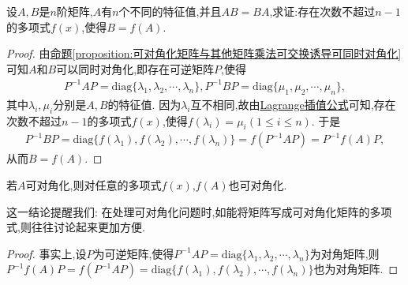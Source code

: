 \documentclass[../../main.tex]{subfiles}
\begin{document}
\begin{proposition}\label{proposition:有n个不同特征值的矩阵乘法可交换诱导多项式表示}
设$A,B$是$n$阶矩阵,$A$有$n$个不同的特征值,并且$AB = BA$,求证:存在次数不超过$n - 1$的多项式$f(x)$,使得$B = f(A)$.
\end{proposition}
\begin{proof}
由\hyperref[proposition:可对角化矩阵与其他矩阵乘法可交换诱导可同时对角化]{命题\ref{proposition:可对角化矩阵与其他矩阵乘法可交换诱导可同时对角化}}可知$A$和$B$可以同时对角化,即存在可逆矩阵$P$,使得
\begin{align*}
P^{-1}AP=\mathrm{diag}\{\lambda_1,\lambda_2,\cdots,\lambda_n\}, P^{-1}BP=\mathrm{diag}\{\mu_1,\mu_2,\cdots,\mu_n\},
\end{align*}
其中$\lambda_i,\mu_i$分别是$A,B$的特征值. 因为$\lambda_i$互不相同,故由\hyperref[theorem:Lagrange插值公式]{Lagrange插值公式}可知,存在次数不超过$n - 1$的多项式$f(x)$,使得$f(\lambda_i)=\mu_i(1\leq i\leq n)$. 于是
\begin{align*}
P^{-1}BP=\mathrm{diag}\{f(\lambda_1),f(\lambda_2),\cdots,f(\lambda_n)\}=f(P^{-1}AP)=P^{-1}f(A)P,
\end{align*}
从而$B = f(A)$.
\end{proof}

\begin{proposition}\label{proposition:矩阵A可对角化则f(A)也可对角化}
若$A$可对角化,则对任意的多项式$f(x)$,$f(A)$也可对角化.
\end{proposition}
\begin{note}
这一结论提醒我们: 在处理可对角化问题时,如能将矩阵写成可对角化矩阵的多项式,则往往讨论起来更加方便.
\end{note}
\begin{proof}
事实上,设$P$为可逆矩阵,使得$P^{-1}AP=\mathrm{diag}\{\lambda_1,\lambda_2,\cdots,\lambda_n\}$为对角矩阵,则$P^{-1}f(A)P=f(P^{-1}AP)=\mathrm{diag}\{f(\lambda_1),f(\lambda_2),\cdots,f(\lambda_n)\}$也为对角矩阵.
\end{proof}
\end{document}
